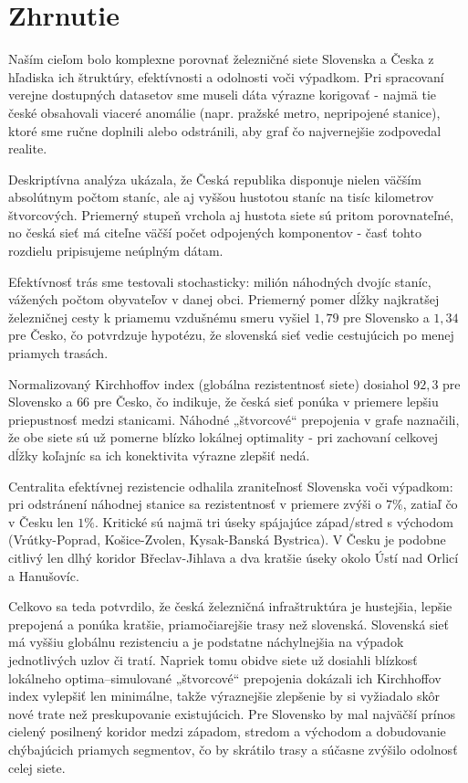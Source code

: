 \documentclass[main.tex]{subfiles}
\begin{document}
	\section{Zhrnutie}
Naším cieľom bolo komplexne porovnať železničné siete Slovenska a Česka z hľadiska ich štruktúry, efektívnosti a odolnosti voči výpadkom. Pri spracovaní verejne dostupných datasetov sme museli dáta výrazne korigovať - najmä tie české obsahovali viaceré anomálie (napr. pražské metro, nepripojené stanice), ktoré sme ručne doplnili alebo odstránili, aby graf čo najvernejšie zodpovedal realite.

Deskriptívna analýza ukázala, že Česká republika disponuje nielen väčším absolútnym počtom staníc, ale aj vyššou hustotou staníc na tisíc kilometrov štvorcových. Priemerný stupeň vrchola aj hustota siete sú pritom porovnateľné, no česká sieť má citeľne väčší počet odpojených komponentov - časť tohto rozdielu pripisujeme neúplným dátam.

Efektívnosť trás sme testovali stochasticky: milión náhodných dvojíc staníc, vážených počtom obyvateľov v danej obci. Priemerný pomer dĺžky najkratšej železničnej cesty k priamemu vzdušnému smeru vyšiel $1,79$ pre Slovensko a $1,34$ pre Česko, čo potvrdzuje hypotézu, že slovenská sieť vedie cestujúcich po menej priamych trasách.

Normalizovaný Kirchhoffov index (globálna rezistentnosť siete) dosiahol $92,3$ pre Slovensko a $66$ pre Česko, čo indikuje, že česká sieť ponúka v priemere lepšiu priepustnosť medzi stanicami. Náhodné „štvorcové“ prepojenia v grafe naznačili, že obe siete sú už pomerne blízko lokálnej optimality - pri zachovaní celkovej dĺžky koľajníc sa ich konektivita výrazne zlepšiť nedá.

Centralita efektívnej rezistencie odhalila zraniteľnosť Slovenska voči výpadkom: pri odstránení náhodnej stanice sa rezistentnosť v priemere zvýši o $7\%$, zatiaľ čo v Česku len $1\%$. Kritické sú najmä tri úseky spájajúce západ/stred s východom (Vrútky-Poprad, Košice-Zvolen, Kysak-Banská Bystrica). V Česku je podobne citlivý len dlhý koridor Břeclav-Jihlava a dva kratšie úseky okolo Ústí nad Orlicí a Hanušovíc.

Celkovo sa teda potvrdilo, že česká železničná infraštruktúra je hustejšia, lepšie prepojená a ponúka kratšie, priamočiarejšie trasy než slovenská. Slovenská sieť má vyššiu globálnu rezistenciu a je podstatne náchylnejšia na výpadok jednotlivých uzlov či tratí. Napriek tomu obidve siete už dosiahli blízkosť lokálneho optima--simulované „štvorcové“ prepojenia dokázali ich Kirchhoffov index vylepšiť len minimálne, takže výraznejšie zlepšenie by si vyžiadalo skôr nové trate než preskupovanie existujúcich. Pre Slovensko by mal najväčší prínos cielený posilnený koridor medzi západom, stredom a východom a dobudovanie chýbajúcich priamych segmentov, čo by skrátilo trasy a súčasne zvýšilo odolnosť celej siete.
	
\end{document}
